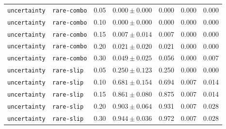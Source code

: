 \documentclass{article}
\begin{document}
\begin{center}
\begin{tabular}{lllcccc}
\texttt{uncertainty} & \texttt{rare-combo} & 0.05 & $0.000 \pm 0.000$ & 0.000 & 0.000 & 0.000 \\
\texttt{uncertainty} & \texttt{rare-combo} & 0.10 & $0.000 \pm 0.000$ & 0.000 & 0.000 & 0.000 \\
\texttt{uncertainty} & \texttt{rare-combo} & 0.15 & $0.007 \pm 0.014$ & 0.007 & 0.000 & 0.000 \\
\texttt{uncertainty} & \texttt{rare-combo} & 0.20 & $0.021 \pm 0.020$ & 0.021 & 0.000 & 0.000 \\
\texttt{uncertainty} & \texttt{rare-combo} & 0.30 & $0.049 \pm 0.025$ & 0.056 & 0.000 & 0.007 \\
\texttt{uncertainty} & \texttt{rare-slip} & 0.05 & $0.250 \pm 0.123$ & 0.250 & 0.000 & 0.000 \\
\texttt{uncertainty} & \texttt{rare-slip} & 0.10 & $0.681 \pm 0.154$ & 0.694 & 0.007 & 0.014 \\
\texttt{uncertainty} & \texttt{rare-slip} & 0.15 & $0.861 \pm 0.080$ & 0.875 & 0.007 & 0.014 \\
\texttt{uncertainty} & \texttt{rare-slip} & 0.20 & $0.903 \pm 0.064$ & 0.931 & 0.007 & 0.028 \\
\texttt{uncertainty} & \texttt{rare-slip} & 0.30 & $0.944 \pm 0.036$ & 0.972 & 0.007 & 0.028 \\
\bottomrule
\end{tabular}
\end{center}
\normalsize
\end{document}
